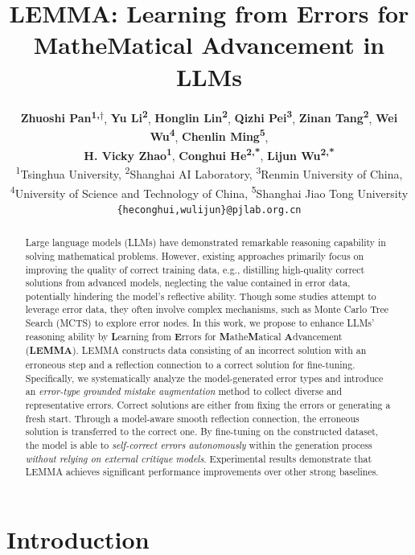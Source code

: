 \documentclass[11pt]{article}
\title{LEMMA: Learning from Errors for MatheMatical Advancement in LLMs}
\author{
  \textbf{Zhuoshi Pan\textsuperscript{1,$\dagger$}},
  \textbf{Yu Li\textsuperscript{2}},
  \textbf{Honglin Lin\textsuperscript{2}},
  \textbf{Qizhi Pei\textsuperscript{3}},
  \textbf{Zinan Tang\textsuperscript{2}},
  \textbf{Wei Wu\textsuperscript{4}},
  \textbf{Chenlin Ming\textsuperscript{5}},\\
  \textbf{H. Vicky Zhao\textsuperscript{1}},
  \textbf{Conghui He\textsuperscript{2,*}},
  \textbf{Lijun Wu\textsuperscript{2,*}}
\\[2mm]
  \textsuperscript{1}Tsinghua University,
  \textsuperscript{2}Shanghai AI Laboratory, 
  \textsuperscript{3}Renmin University of China, \\
  \textsuperscript{4}University of Science and Technology of China,
  \textsuperscript{5}Shanghai Jiao Tong University\\
  \texttt{\{heconghui,wulijun\}@pjlab.org.cn}
\\[2mm]
}
\begin{document}
\maketitle
{}

\begin{abstract}
  Large language models (LLMs) have demonstrated remarkable reasoning capability in solving mathematical problems. However, existing approaches primarily focus on improving the quality of correct training data, e.g., distilling high-quality correct solutions from advanced models, neglecting the value contained in error data, potentially hindering the model's reflective ability. Though some studies attempt to leverage error data, they often involve complex mechanisms, such as Monte Carlo Tree Search (MCTS) to explore error nodes.
  In this work, we propose to enhance LLMs' reasoning ability by \textbf{L}earning from \textbf{E}rrors for \textbf{M}athe\textbf{M}atical \textbf{A}dvancement (\textbf{LEMMA}). LEMMA constructs data consisting of an incorrect solution with an erroneous step and a reflection connection to a correct solution for fine-tuning. 
  Specifically, we systematically analyze the model-generated error types and introduce an \textit{error-type grounded mistake augmentation} method to collect diverse and representative errors.
  Correct solutions are either from fixing the errors or generating a fresh start. 
  Through a model-aware smooth reflection connection, the erroneous solution is transferred to the correct one.
  By fine-tuning on the constructed dataset, the model is able to \textit{self-correct errors autonomously} within the generation process \textit{without relying on external critique models}.
  Experimental results demonstrate that LEMMA achieves significant performance improvements over other strong baselines.
\end{abstract}



\section{Introduction}
\end{document}

